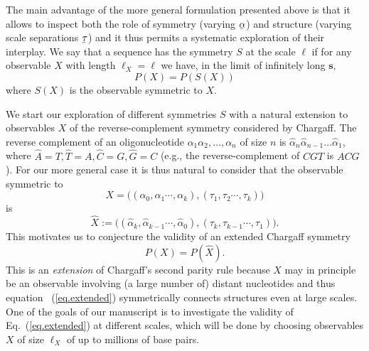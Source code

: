 \documentclass[fleqn,10pt]{wlscirep}
\begin{document}
The main advantage of the more general formulation presented above is that it allows to inspect both the  role of  symmetry (varying $\underaccent{\bar}{\alpha}$) and structure (varying scale separations $\underaccent{\bar}{\tau}$)  and it thus permits a systematic exploration of their interplay.  We say that a sequence has the symmetry $S$ at the scale $\ell$ if for any observable $X$ with length $\ell_X=\ell$ we have, in the limit of infinitely long $\textbf{s}$,
%
%
\begin{equation}\label{eq.S}
P(X) = P(S(X))
\end{equation}
%
%
where $S(X)$ is the observable symmetric to $X$.

We start our exploration of different symmetries $S$ with a natural extension to observables $X$ of the reverse-complement symmetry considered by Chargaff. 
The reverse complement of an oligonucleotide $\alpha_1\alpha_2,\ldots, \alpha_n$ of size $n$ is $\hat{\alpha}_n\hat{\alpha}_{n-1}\ldots\hat{\alpha}_1$, where $\hat{A}=T, \hat{T}=A, {\hat{C}=G,\hat{G}=C}$ (e.g., the reverse-complement of $CGT$ is $ACG$). For our more general case it is thus natural to consider that the observable symmetric to
%
\begin{equation*}
  X  = \Big( (\alpha_0,  \alpha_1 \cdots, \alpha_k), (\tau_1, \tau_2 \cdots, \tau_k )\Big)
  \end{equation*}
%
is 
%
\begin{equation}\label{EC}
 \hat{X}:=\Big(  (\hat{\alpha}_k, \hat{ \alpha}_{k-1} \cdots, \hat{\alpha}_0 ) , ( \tau_k, \tau_{k-1} \cdots, \tau_1) \Big).
\end{equation}
%
This motivates us to conjecture the validity of an extended Chargaff symmetry
%
\begin{equation}\label{eq.extended}
P(X) = P(\hat{X}).
\end{equation}
%
%
This is an {\it extension} of Chargaff's second parity rule because $X$  may in principle be an observable involving (a large number of) distant nucleotides and thus equation~ (\ref{eq.extended})  symmetrically connects  structures  even at large scales. One of the goals of our manuscript is to investigate the validity of Eq.~(\ref{eq.extended}) at different scales, which will be done by choosing observables $X$ of size $\ell_X$ of up to millions of base pairs. 
\end{document}

